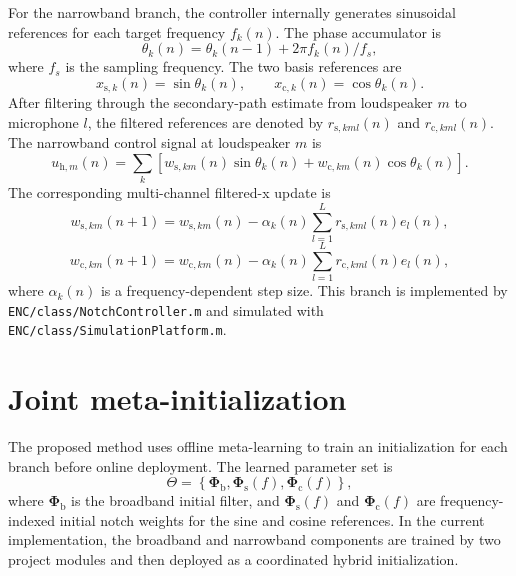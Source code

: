 \documentclass{internoise2026}
\begin{document}
For the narrowband branch, the controller internally generates sinusoidal references for each target frequency $f_k(n)$. The phase accumulator is
\begin{equation}
  \theta_k(n)=\theta_k(n-1)+2\pi f_k(n)/f_s,
  \label{eq:phase}
\end{equation}
where $f_s$ is the sampling frequency. The two basis references are
\begin{equation}
  x_{\mathrm{s},k}(n)=\sin\theta_k(n),
  \qquad
  x_{\mathrm{c},k}(n)=\cos\theta_k(n).
  \label{eq:sin_cos}
\end{equation}
After filtering through the secondary-path estimate from loudspeaker $m$ to microphone $l$, the filtered references are denoted by $r_{\mathrm{s},kml}(n)$ and $r_{\mathrm{c},kml}(n)$. The narrowband control signal at loudspeaker $m$ is
\begin{equation}
  u_{\mathrm{h},m}(n)=
  \sum_{k}
  \left[
  w_{\mathrm{s},km}(n)\sin\theta_k(n)
  + w_{\mathrm{c},km}(n)\cos\theta_k(n)
  \right].
  \label{eq:notch_control}
\end{equation}
The corresponding multi-channel filtered-x update is
\begin{equation}
  w_{\mathrm{s},km}(n+1)
  =
  w_{\mathrm{s},km}(n)
  - \alpha_k(n)\sum_{l=1}^{L} r_{\mathrm{s},kml}(n)e_l(n),
  \label{eq:notch_update_sin}
\end{equation}
\begin{equation}
  w_{\mathrm{c},km}(n+1)
  =
  w_{\mathrm{c},km}(n)
  - \alpha_k(n)\sum_{l=1}^{L} r_{\mathrm{c},kml}(n)e_l(n),
  \label{eq:notch_update_cos}
\end{equation}
where $\alpha_k(n)$ is a frequency-dependent step size. This branch is implemented by \texttt{ENC/class/NotchController.m} and simulated with \texttt{ENC/class/SimulationPlatform.m}.

\section{Joint meta-initialization}

The proposed method uses offline meta-learning to train an initialization for each branch before online deployment. The learned parameter set is
\begin{equation}
  \Theta =
  \left\{
  \boldsymbol{\Phi}_{\mathrm{b}},
  \boldsymbol{\Phi}_{\mathrm{s}}(f),
  \boldsymbol{\Phi}_{\mathrm{c}}(f)
  \right\},
  \label{eq:theta_set}
\end{equation}
where $\boldsymbol{\Phi}_{\mathrm{b}}$ is the broadband initial filter, and $\boldsymbol{\Phi}_{\mathrm{s}}(f)$ and $\boldsymbol{\Phi}_{\mathrm{c}}(f)$ are frequency-indexed initial notch weights for the sine and cosine references. In the current implementation, the broadband and narrowband components are trained by two project modules and then deployed as a coordinated hybrid initialization.
\end{document}

